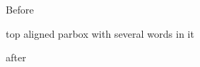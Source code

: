 \documentclass[12pt]{article}
\begin{document}
Before \parbox[t]{3cm}{top aligned parbox with several words in it} after
\end{document}
